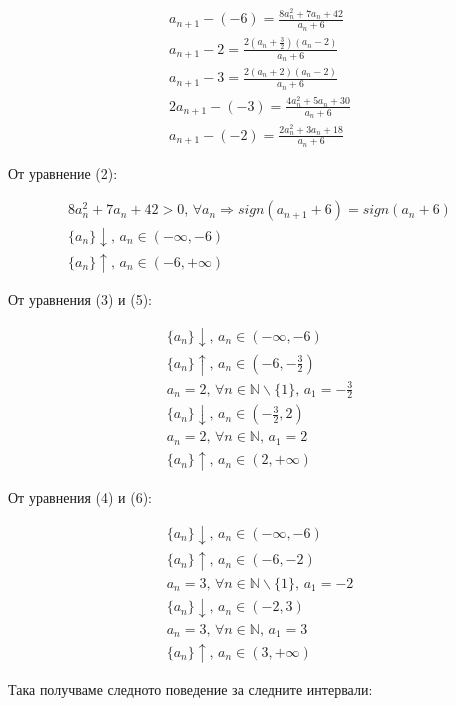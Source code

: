 \documentclass{article}
\begin{document}
\begin{gather}
    a_{n+1} - (-6) = \frac{8a_n^2 + 7a_n + 42}{a_n + 6} \\
    a_{n+1} - 2 = \frac{2(a_n + \frac{3}{2})(a_n - 2)}{a_n + 6} \\
    a_{n+1} - 3 = \frac{2(a_n + 2)(a_n - 2)}{a_n + 6} \\
    2a_{n+1} - (-3) = \frac{4a_n^2 + 5a_n + 30}{a_n + 6} \\
    a_{n+1} - (-2) = \frac{2a_n^2 + 3a_n + 18}{a_n + 6}
\end{gather}

От уравнение (2):

\begin{gather*}
    8a_n^2 + 7a_n + 42 > 0,\, \forall a_n \Longrightarrow sign(a_{n+1} + 6) = sign(a_n + 6) \\
    \{a_n\}\downarrow ,\, a_n \in (-\infty, -6) \\
    \{a_n\}\uparrow ,\, a_n \in (-6, +\infty)
\end{gather*}

От уравнения (3) и (5):

\begin{gather*}
    \{a_n\}\downarrow ,\, a_n \in (-\infty, -6) \\
    \{a_n\}\uparrow ,\, a_n \in \left(-6, -\frac{3}{2}\right) \\
    a_n = 2,\, \forall n \in \mathbb{N} \backslash \{1\},\, a_1 = -\frac{3}{2} \\
    \{a_n\}\downarrow ,\, a_n \in \left(-\frac{3}{2}, 2\right) \\
    a_n = 2,\, \forall n \in \mathbb{N},\, a_1 = 2 \\
    \{a_n\}\uparrow ,\, a_n \in (2, +\infty)
\end{gather*}

От уравнения (4) и (6):

\begin{gather*}
    \{a_n\}\downarrow ,\, a_n \in (-\infty, -6) \\
    \{a_n\}\uparrow ,\, a_n \in (-6, -2) \\
    a_n = 3,\, \forall n \in \mathbb{N} \backslash \{1\},\, a_1 = -2 \\
    \{a_n\}\downarrow ,\, a_n \in (-2, 3) \\
    a_n = 3,\, \forall n \in \mathbb{N},\, a_1 = 3 \\
    \{a_n\}\uparrow ,\, a_n \in (3, +\infty)
\end{gather*}

Така получваме следното поведение за следните интервали:
\end{document}
